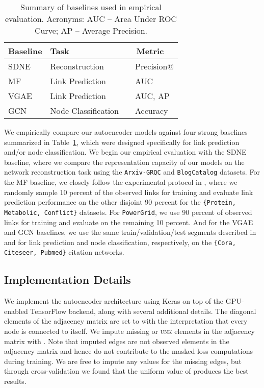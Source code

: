\documentclass[letterpaper, conference]{IEEEtran}
\begin{document}
\begin{table}[ht]
\begin{center}
\caption[Caption for Table 2]{Summary of baselines used in empirical evaluation. Acronyms: AUC -- Area Under ROC Curve; AP -- Average Precision.}
\begin{adjustbox}{width=0.5\textwidth}
	\begin{tabular} {l  l  l}
	\hline
	\multicolumn{1}{l}{\multirow{1}{*}{\textbf{Baseline}}} &
	\multicolumn{1}{l}{\multirow{1}{*}{\textbf{Task}}} &
	\multicolumn{1}{l}{\multirow{1}{*}{\textbf{~~Metric}}} \\ \hline \hline
    SDNE \cite{Wang:2016} ~
							& Reconstruction
							& ~~Precision@ \\
    MF \cite{Menon:2011} ~
					& Link Prediction
					 & ~~AUC \\
    VGAE \cite{VGAE:2016} ~
				& Link Prediction
				 & ~~AUC, AP \\
    GCN \cite{Kipf:2016} ~
						& Node Classification
				 		& ~~Accuracy \\
	\hline
	\end{tabular}
	\label{tab2}
\end{adjustbox}
\end{center}
\end{table}

We empirically compare our autoencoder models against four strong baselines summarized in Table~\ref{tab2}, which were designed specifically for link prediction and/or node classification. We begin our empirical evaluation with the SDNE \cite{Wang:2016} baseline, where we compare the representation capacity of our models on the network reconstruction task using the \texttt{Arxiv-GRQC} and \texttt{BlogCatalog} datasets. For the MF baseline, we closely follow the experimental protocol in \cite{Menon:2011}, where we randomly sample 10 percent of the observed links for training and evaluate link prediction performance on the other disjoint 90 percent for the \texttt{\{Protein, Metabolic, Conflict\}} datasets. For \texttt{PowerGrid}, we use 90 percent of observed links for training and evaluate on the remaining 10 percent. And for the VGAE and GCN baselines, we use the same train/validation/test segments described in \cite{VGAE:2016} and \cite{Kipf:2016} for link prediction and node classification, respectively, on the \texttt{\{Cora, Citeseer, Pubmed\}} citation networks.

\subsection{Implementation Details}
We implement the autoencoder architecture using Keras \cite{Keras} on top of the GPU-enabled TensorFlow \cite{TF} backend, along with several additional details. The diagonal elements of the adjacency matrix are set to  with the interpretation that every node is connected to itself. We impute missing or \textsc{unk} elements in the adjacency matrix with . Note that imputed edges are not observed elements in the adjacency matrix and hence do not contribute to the masked loss computations during training. We are free to impute any values for the missing edges, but through cross-validation we found that the uniform value of  produces the best results.
\end{document}
